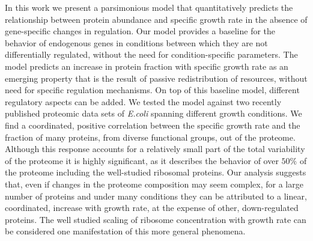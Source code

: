In this work we present a parsimonious model that quantitatively predicts the relationship between protein abundance and specific growth rate in the absence of gene-specific changes in regulation.
Our model provides a baseline for the behavior of endogenous genes in conditions between which they are not differentially regulated, without the need for condition-specific parameters.
The model predicts an increase in protein fraction with specific growth rate as an emerging property that is the result of passive redistribution of resources, without need for specific regulation mechanisms.
On top of this baseline model, different regulatory aspects can be added.
We tested the model against two recently published proteomic data sets of \emph{E.coli} spanning different growth conditions\cite{Peebo_2015,Heinemann2015}.
We find a coordinated, positive correlation between the specific growth rate and the fraction of many proteins, from diverse functional groups, out of the proteome.
Although this response accounts for a relatively small part of the total variability of the proteome it is highly significant, as it describes the behavior of over $50\%$ of the proteome including the well-studied ribosomal proteins.
Our analysis suggests that, even if changes in the proteome composition may seem complex, for a large number of proteins and under many conditions they can be attributed to a linear, coordinated, increase with growth rate, at the expense of other, down-regulated proteins.
The well studied scaling of ribosome concentration with growth rate can be considered one manifestation of this more general phenomena.